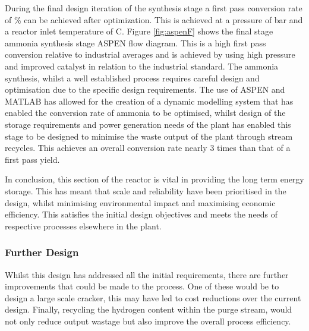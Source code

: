 During the final design iteration of the synthesis stage a first pass conversion rate of \conv \% can be achieved after optimization. This is achieved at a pressure of \pbar  bar and a reactor inlet temperature of \tc\textdegree C. Figure \ref{fig:aspenF} shows the final stage ammonia synthesis stage ASPEN flow diagram. This is a high first pass conversion relative to industrial averages and is achieved by using high pressure and improved catalyst in relation to the industrial standard. The ammonia synthesis, whilst a well established process requires careful design and optimisation due to the specific design requirements. The use of ASPEN and MATLAB has allowed for the creation of a dynamic modelling system that has enabled the conversion rate of ammonia to be optimised, whilst design of the storage requirements and power generation needs of the plant has enabled this stage to be designed to minimise the waste output of the plant through stream recycles. This achieves an overall conversion rate nearly 3 times than that of a first pass yield. 

In conclusion, this section of the reactor is vital in providing the long term energy storage. This has meant that scale and reliability have been prioritised in the design, whilst minimising environmental impact and maximising economic efficiency. This satisfies the initial design objectives and meets the needs of respective processes elsewhere in the plant. 


\subsubsection{Further Design}
Whilst this design has addressed all the initial requirements, there are further improvements that could be made to the process. One of these would be to design a large scale cracker, this may have led to cost reductions over the current design. Finally, recycling the hydrogen content within the purge stream, would not only reduce output wastage but also improve the overall process efficiency.



%